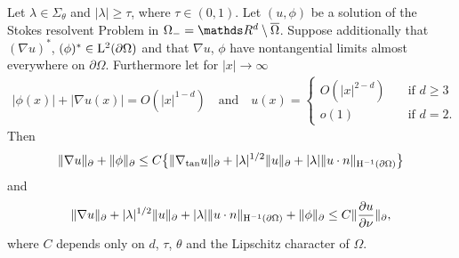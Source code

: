 \begin{thm}
  \label{thm:rellichExterior}
  Let $\lambda \in \Sigma_\theta$ and $|\lambda| \geq \tau$, where $\tau \in (0,1)$.
  Let $(u,\phi)$ be a solution of the Stokes resolvent Problem in $\Omega_- = \R^d \setminus \overline\Omega$.
  Suppose additionally that $(\nabla u)^*$, $(\phi)^* \in \mathrm{L}^2(\partial\Omega)$ and that $\nabla u$, $\phi$ have nontangential limits almost everywhere on $\partial\Omega$.
  Furthermore let for $|x| \to \infty$
  \begin{align*}
    |\phi(x)| + |\nabla u(x)| = O(|x|^{1 - d}) \quad\text{and}\quad 
    u(x) = \begin{cases} O(|x|^{2 - d}) &\quad\text{if } d \geq 3 \\ o(1) &\quad\text{if } d = 2. \end{cases}
  \end{align*}
  Then
  \begin{align}
    \label{eq:rellich1ext}
    \|\nabla u\|_\partial + \|\phi\|_\partial
    \leq C \big\{ \|\nabla_{\mathrm{tan}} u\|_\partial + |\lambda|^{1/2} \|u\|_\partial + |\lambda| \|u \cdot n\|_{\mathrm{H}^{-1}(\partial\Omega)} \big\}
  \end{align}
  and
  \begin{align}
    \label{eq:rellich2ext}
    \|\nabla u\|_\partial + |\lambda|^{1/2} \|u\|_\partial + |\lambda| \|u \cdot n\|_{\mathrm{H}^{-1}(\partial\Omega)} + \|\phi\|_\partial
    \leq C \|\frac{\partial u}{\partial \nu} \|_\partial,
  \end{align}
  where $C$ depends only on $d$, $\tau$, $\theta$ and the Lipschitz character of $\Omega$.
\end{thm}
